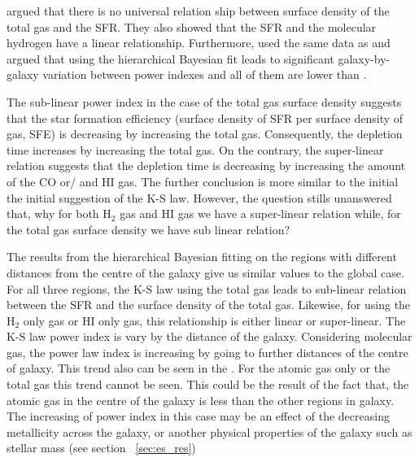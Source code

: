 \documentclass[useAMS,usenatbib]{mn2e}
\begin{document}
 \cite{Bigiel08} argued that there is no universal relation ship between surface density of the total gas and the SFR. They also showed that the SFR and the molecular hydrogen have a linear relationship. Furthermore, \cite{Shetty13} used the same data as \cite{Bigiel08} and argued that using the hierarchical Bayesian fit leads to significant galaxy-by-galaxy variation between power indexes and all of them are lower than \cite{Bigiel08}. 

The sub-linear power index in the case of the total gas surface density suggests that the star formation efficiency (surface density of SFR per surface density of gas, SFE) is decreasing by increasing the total gas. Consequently, the depletion time increases by increasing the total gas. On the contrary, the super-linear relation suggests that the depletion time is decreasing by increasing the amount of the CO or/ and HI gas. The further conclusion is more similar to the initial the initial suggestion of the K-S law. However, the question stills unanswered that, why for both H$_2$ gas and HI gas we have a super-linear relation while, for the total gas surface density we have sub linear relation? %

The results from the hierarchical Bayesian fitting on the regions with different distances from the centre of the galaxy give us similar values to the global case. For all three regions, the K-S law using the total gas leads to sub-linear relation between the SFR and the surface density of the total gas. Likewise, for using the H$_{2}$ only gas or HI only gas, this relationship is either linear or super-linear. The K-S law power index is vary by the distance of the galaxy. Considering molecular gas, the power law index is increasing by going to further distances of the centre of galaxy. This trend also can be seen in the \cite{Ford13}. For the atomic gas only or the total gas this trend cannot be seen. This could be the result of the fact that, the atomic gas in the centre of the galaxy is less than the other regions in galaxy. The increasing of power index in this case may be an effect of the decreasing metallicity across the galaxy, or another physical properties of the galaxy such as stellar mass (see section ~\ref{sec:es_res})
  
\end{document}
